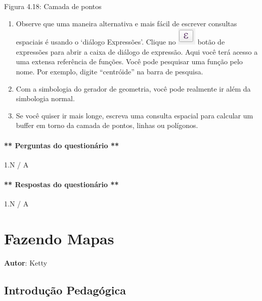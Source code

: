 \documentclass[
]{book}
\providecommand{\tightlist}{%
  \setlength{\itemsep}{0pt}\setlength{\parskip}{0pt}}
\begin{document}
Figura 4.18: Camada de pontos

\begin{enumerate}
\def\labelenumi{\arabic{enumi}.}
\setcounter{enumi}{3}
\tightlist
\item
  Observe que uma maneira alternativa e mais fácil de escrever consultas espaciais é usando o `diálogo Expressões'. Clique no \includegraphics{media/modulo4/expression.png} botão de expressões para abrir a caixa de diálogo de expressão. Aqui você terá acesso a uma extensa referência de funções. Você pode pesquisar uma função pelo nome. Por exemplo, digite ``centróide'' na barra de pesquisa.
\item
  Com a simbologia do gerador de geometria, você pode realmente ir além da simbologia normal.
\item
  Se você quiser ir mais longe, escreva uma consulta espacial para calcular um buffer em torno da camada de pontos, linhas ou polígonos.
\end{enumerate}

\hypertarget{perguntas-do-questionuxe1rio-10}{%
\subsubsection{** Perguntas do questionário **}\label{perguntas-do-questionuxe1rio-10}}

1.N / A

\hypertarget{respostas-do-questionuxe1rio-1}{%
\subsubsection{** Respostas do questionário **}\label{respostas-do-questionuxe1rio-1}}

1.N / A

\hypertarget{fazendo-mapas}{%
\chapter{Fazendo Mapas}\label{fazendo-mapas}}

\textbf{Autor}: Ketty

\hypertarget{introduuxe7uxe3o-pedaguxf3gica-5}{%
\section{Introdução Pedagógica}\label{introduuxe7uxe3o-pedaguxf3gica-5}}
\end{document}
